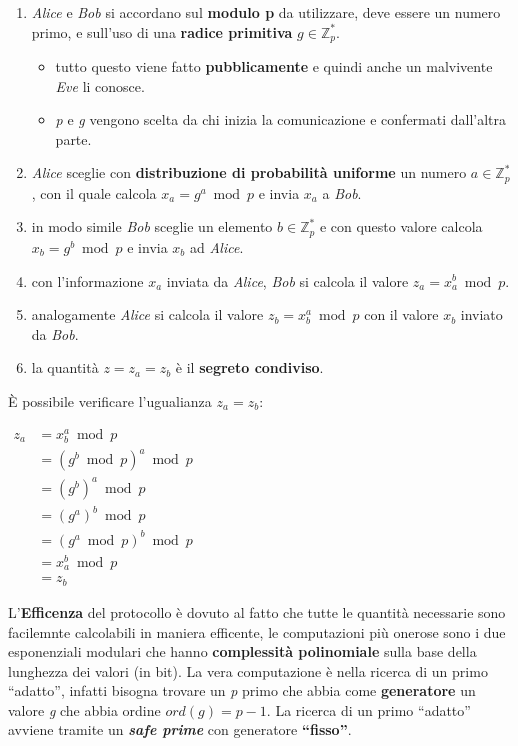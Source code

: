 \begin{enumerate}
    \item \textit{Alice} e \textit{Bob} si accordano sul \textbf{modulo p} da utilizzare, deve essere un numero primo, e sull'uso di una \textbf{radice primitiva} $g \in \mathbb{Z}_p^*$.
    \begin{itemize}
        \item tutto questo viene fatto \textbf{pubblicamente} e quindi anche un malvivente \textit{Eve} li conosce.
        \item \textit{p} e \textit{g} vengono scelta da chi inizia la comunicazione e confermati dall'altra parte.
    \end{itemize}
    \item \textit{Alice} sceglie con \textbf{distribuzione di probabilità uniforme} un numero $a \in \mathbb{Z}_p^*$, con il quale calcola $x_a = g^a \bmod p$ e invia $x_a$ a \textit{Bob}.
    \item in modo simile \textit{Bob} sceglie un elemento $b \in \mathbb{Z}_p^*$ e con questo valore calcola $x_b = g^b \bmod p$ e invia $x_b$ ad \textit{Alice}.
    \item con l'informazione $x_a$ inviata da \textit{Alice}, \textit{Bob} si calcola il valore $z_a = x_a^b \bmod p$.
    \item analogamente \textit{Alice} si calcola il valore $z_b = x_b^a \bmod p$ con il valore $x_b$ inviato da \textit{Bob}.
    \item la quantità $z = z_a = z_b$ è il \textbf{segreto condiviso}.
\end{enumerate}
È possibile verificare l'ugualianza $z_a = z_b$:
\begin{center}
    \begin{math}
        \begin{aligned}
            z_a &= x_b^a \bmod p \\
            &= (g^b \bmod p)^a \bmod p \\
            &= (g^b)^a \bmod p \\
            &= (g^a)^b \bmod p \\
            &= (g^a \bmod p)^b \bmod p \\
            &= x_a^b \bmod p \\
            &= z_b
        \end{aligned}
    \end{math}
\end{center}
L'\textbf{Efficenza} del protocollo è dovuto al fatto che tutte le quantità necessarie sono facilemnte calcolabili in maniera efficente, le computazioni più onerose sono i due esponenziali modulari che hanno \textbf{complessità polinomiale} sulla base della lunghezza dei valori (in bit). La vera computazione è nella ricerca di un primo ``adatto'', infatti bisogna trovare un \textit{p} primo che abbia come \textbf{generatore} un valore \textit{g} che abbia ordine $ord(g) = p - 1$. La ricerca di un primo ``adatto'' avviene tramite un \textbf{\textit{safe prime}} con generatore \textbf{``fisso''}.
